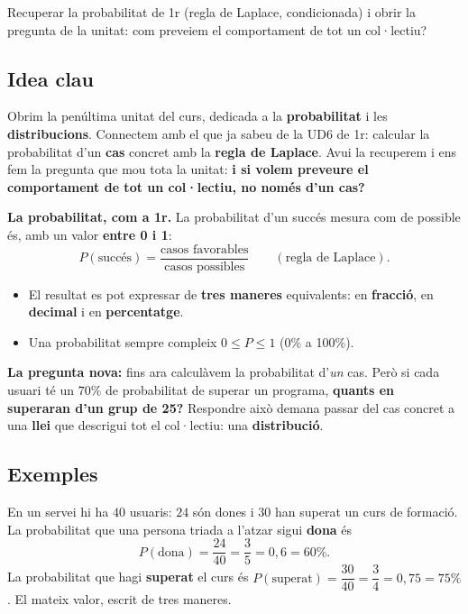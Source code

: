 %
{Recuperar la probabilitat de 1r (regla de Laplace, condicionada) i obrir la pregunta de la unitat: com preveiem el comportament de tot un col·lectiu?}

\subsection{Idea clau}

Obrim la penúltima unitat del curs, dedicada a la \textbf{probabilitat} i les
\textbf{distribucions}. Connectem amb el que ja sabeu de la UD6 de 1r: calcular la
probabilitat d'un \textbf{cas} concret amb la \textbf{regla de Laplace}. Avui la
recuperem i ens fem la pregunta que mou tota la unitat: \textbf{i si volem preveure el
comportament de tot un col·lectiu, no només d'un cas?}

\begin{idea}
\textbf{La probabilitat, com a 1r.} La probabilitat d'un succés mesura com de possible
és, amb un valor \textbf{entre 0 i 1}:
\[
P(\text{succés})=\frac{\text{casos favorables}}{\text{casos possibles}}\qquad
(\text{regla de Laplace}).
\]
\begin{itemize}[leftmargin=1.4em, itemsep=2pt]
  \item El resultat es pot expressar de \textbf{tres maneres} equivalents: en
        \textbf{fracció}, en \textbf{decimal} i en \textbf{percentatge}.
  \item Una probabilitat sempre compleix $0\le P\le 1$ (0\% a 100\%).
\end{itemize}
\textbf{La pregunta nova:} fins ara calculàvem la probabilitat d'\emph{un} cas. Però si
cada usuari té un $70\%$ de probabilitat de superar un programa, \textbf{quants en
superaran d'un grup de 25?} Respondre això demana passar del cas concret a una
\textbf{llei} que descrigui tot el col·lectiu: una \textbf{distribució}.
\end{idea}

\subsection{Exemples}

\begin{exemple}
En un servei hi ha $40$ usuaris: $24$ són dones i $30$ han superat un curs de formació.
La probabilitat que una persona triada a l'atzar sigui \textbf{dona} és
\[
P(\text{dona})=\frac{24}{40}=\frac{3}{5}=0,6=60\%.
\]
La probabilitat que hagi \textbf{superat} el curs és
$P(\text{superat})=\dfrac{30}{40}=\dfrac{3}{4}=0,75=75\%$. El mateix valor, escrit de
tres maneres.
\end{exemple}

